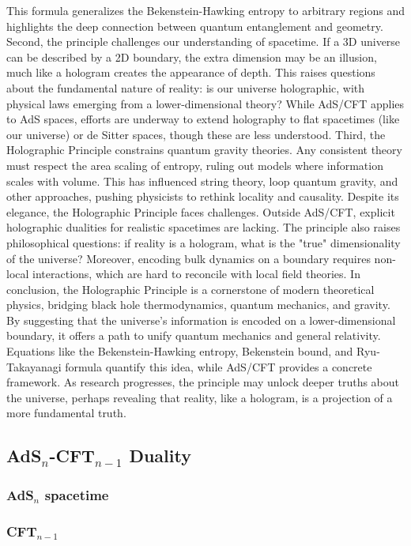 This formula generalizes the Bekenstein-Hawking entropy to arbitrary regions and highlights the deep connection between quantum entanglement and geometry.
Second, the principle challenges our understanding of spacetime. If a 3D universe can be described by a 2D boundary, the extra dimension may be an illusion, much like a hologram creates the appearance of depth. This raises questions about the fundamental nature of reality: is our universe holographic, with physical laws emerging from a lower-dimensional theory? While AdS/CFT applies to AdS spaces, efforts are underway to extend holography to flat spacetimes (like our universe) or de Sitter spaces, though these are less understood.
Third, the Holographic Principle constrains quantum gravity theories. Any consistent theory must respect the area scaling of entropy, ruling out models where information scales with volume. This has influenced string theory, loop quantum gravity, and other approaches, pushing physicists to rethink locality and causality.
Despite its elegance, the Holographic Principle faces challenges. Outside AdS/CFT, explicit holographic dualities for realistic spacetimes are lacking. The principle also raises philosophical questions: if reality is a hologram, what is the "true" dimensionality of the universe? Moreover, encoding bulk dynamics on a boundary requires non-local interactions, which are hard to reconcile with local field theories.
In conclusion, the Holographic Principle is a cornerstone of modern theoretical physics, bridging black hole thermodynamics, quantum mechanics, and gravity. By suggesting that the universe’s information is encoded on a lower-dimensional boundary, it offers a path to unify quantum mechanics and general relativity. Equations like the Bekenstein-Hawking entropy, Bekenstein bound, and Ryu-Takayanagi formula quantify this idea, while AdS/CFT provides a concrete framework. As research progresses, the principle may unlock deeper truths about the universe, perhaps revealing that reality, like a hologram, is a projection of a more fundamental truth.


\subsection{AdS$_n$-CFT$_{n-1}$ Duality}

\subsubsection{AdS$_n$ spacetime}


\subsubsection{CFT$_{n-1}$}

